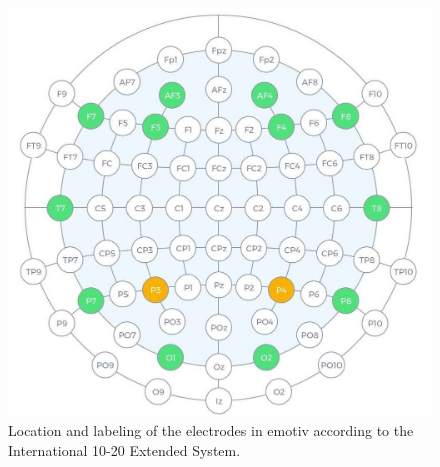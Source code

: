 \documentclass[english]{textolivre}
\begin{document}
\begin{figure}[h!]
 \centering
 \begin{minipage}{.45\textwidth}
 \includegraphics[width=\textwidth]{fig2.png}
 \caption{Location and labeling of the electrodes in emotiv according to the International 10-20 Extended System.}
 \label{fig02}
 \end{minipage}%
 \qquad
 \begin{minipage}{0.45\textwidth}

\end{minipage}
\end{figure}
\end{document}
